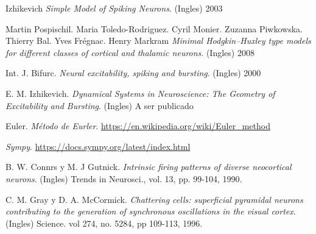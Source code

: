 \documentclass[12pt]{article}
\begin{document}
\begin{thebibliography}{9}

Izhikevich
\textit{Simple Model of Spiking Neurons}. (Ingles) 2003

Martin Pospischil. Maria Toledo-Rodriguez. Cyril Monier. Zuzanna Piwkowska. Thierry Bal. Yves Frégnac. Henry Markram
\textit{Minimal Hodgkin–Huxley type models for different classes of cortical and thalamic neurons}. (Ingles) 2008

Int. J. Bifurc.
\textit{Neural excitability, spiking and bursting}. (Ingles) 2000

E. M. Izhikevich.
\textit{Dynamical Systems in Neuroscience: The Geometry of Excitability and Bursting}. (Ingles) A ser publicado

Euler.
\textit{Método de Eurler}. \url{https://en.wikipedia.org/wiki/Euler_method}

\textit{Sympy}. \url{https://docs.sympy.org/latest/index.html}

B. W. Connrs y M. J Gutnick.
\textit{Intrinsic firing patterns of diverse neocortical neurons}. (Ingles) Trends in Neurosci., vol. 13, pp. 99-104, 1990.

C. M. Gray y D. A. McCormick.
\textit{Chattering cells: superficial pyramidal neurons contributing to the generation of synchronous oscillations in the visual cortex}. (Ingles) Science. vol 274, no. 5284, pp 109-113, 1996.

\end{thebibliography}
\end{document}
